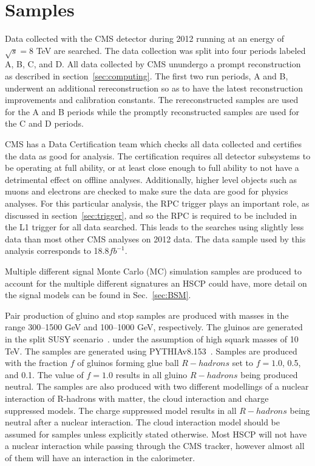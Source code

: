 \section{Samples \label{sec:samples}}

Data collected with the CMS detector during 2012 running at an energy of $\sqrt{s}=8$ TeV are searched. The data collection was split into four periods labeled A, B, C, and D.
All data collected by CMS unundergo a prompt reconstruction as described in section~\ref{sec:computing}. The first two run periods, A and B, underwent an additional
rereconstruction so as to have the latest reconstruction improvements and calibration constants. The rereconstructed samples are used for the A and B periods while the promptly
reconstructed samples are used for the C and D periods.

CMS has a Data Certification team which checks all data collected and certifies the data as good for analysis. The certification requires all detector subsystems to be
operating at full ability, or at least close enough to full ability to not have a detrimental effect on offline analyses. Additionally, higher level objects such as muons
and electrons are checked to make sure the data are good for physics analyses. For this particular analysis, the RPC trigger plays an important role, as discussed in
section~\ref{sec:trigger}, and so the RPC is required to be included in the L1 trigger for all data searched. This leads to the searches using slightly less data
than most other CMS analyses on 2012 data. The data sample used by this analysis corresponds to 18.8$fb^{-1}$.

Multiple different signal Monte Carlo (MC) simulation samples are produced to account for the multiple different signatures an HSCP could have,
more detail on the signal models can be found in Sec.~\ref{sec:BSM}.

Pair production of gluino and stop samples are produced with
masses in the range 300--1500 GeV and 100--1000 GeV, respectively.
The gluinos are generated in the split SUSY scenario~\cite{ArkaniHamed:2004fb, Giudice:2004tc}. 
under the assumption of high squark masses of 10 TeV. The samples are generated using PYTHIAv8.153~\cite{Sjostrand:2007gs}. 
Samples are produced with the fraction $f$ of gluinos forming glue ball $R-hadrons$ set to $f=1.0$, 0.5, and 0.1.
The value of $f=1.0$ results in all gluino $R-hadrons$ being produced neutral.
The samples are also produced with two different modellings of a nuclear interaction of R-hadrons with matter, the cloud interaction and charge suppressed models.
The charge suppressed model results in all $R-hadrons$ being neutral after a nuclear interaction.
The cloud interaction model should be assumed for samples unless explicitly stated otherwise.
Most HSCP will not have a nuclear interaction while passing through the CMS tracker, however almost all of them will have an interaction in the calorimeter.

